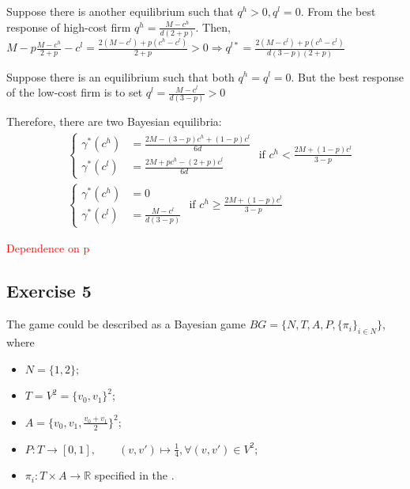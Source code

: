\documentclass[]{article}
\begin{document}
Suppose there is another equilibrium such that $q^h > 0, q^l = 0$. From the best response of high-cost firm $q^h = \frac{M - c^h}{d(2 + p)}$. Then, $M - p\frac{M - c^h}{2 + p} - c^l = \frac{2(M - c^l) + p(c^h - c^l)}{2 + p} > 0 \Rightarrow q^{l*} = \frac{2(M - c^l) + p(c^h - c^l)}{d(3 - p)(2 + p)}$ \Lightning

Suppose there is an equilibrium such that both $q^h = q^l = 0$. But the best response of the low-cost firm is to set $q^l = \frac{M - c^l}{d(3 - p)} > 0$ \Lightning

Therefore, there are two Bayesian equilibria:
\begin{equation}
	\begin{split}
		&\begin{cases}
			\gamma^*(c^h)& = \frac{2M - (3 - p)c^h + (1 - p)c^l}{6d} \\
			\gamma^*(c^l)& = \frac{2M + pc^h - (2 + p)c^l}{6d}
		\end{cases}\text{ if } c^h < \frac{2M + (1 - p)c^l}{3 - p}\\ \nonumber
		&\begin{cases}
			\gamma^*(c^h)& = 0 \\
			\gamma^*(c^l)& = \frac{M - c^l}{d(3 - p)}
		\end{cases}\text{ if } c^h \geq \frac{2M + (1 - p)c^l}{3 - p}
	\end{split}
\end{equation}

{\huge\textcolor{red}{Dependence on p}}

\subsection*{Exercise 5}

The game could be described as a Bayesian game $BG = \{N, T, A, P, \{\pi_i\}_{i\in N}\}$, where
\begin{itemize}[label={}]
	\item $N = \{1, 2\}$;
	\item $T = V^2 = \{v_0, v_1\}^2$;
	\item $A = \{v_0, v_1, \frac{v_0 + v_1}{2}\}^2$;
	\item $P: T \to [0, 1], \qquad (v, v') \mapsto \frac{1}{4},\forall(v, v')\in V^2$;
	\item $\pi_i: T\times A\to \mathbb{R}$ specified in the .
\end{itemize}
\end{document}
